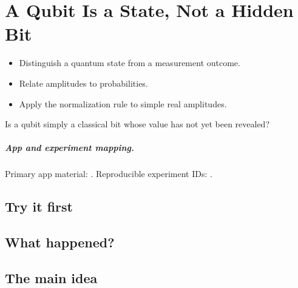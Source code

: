 \chapter{A Qubit Is a State, Not a Hidden Bit}
\label{chap:a-qubit-is-a-state-not-a-hidden-bit}

\begin{learningobjectives}
\begin{itemize}
  \item Distinguish a quantum state from a measurement outcome.
  \item Relate amplitudes to probabilities.
  \item Apply the normalization rule to simple real amplitudes.
\end{itemize}
\end{learningobjectives}

\begin{openingquestion}
Is a qubit simply a classical bit whose value has not yet been revealed?
\end{openingquestion}

\paragraph{App and experiment mapping.}
Primary app material: . Reproducible experiment IDs:
.

\section{Try it first}
\begin{tryit}
\end{tryit}

\section{What happened?}

\section{The main idea}
\begin{coreidea}
\end{coreidea}

